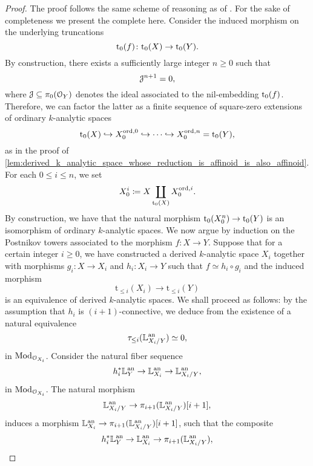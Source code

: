 \documentclass[10pt,a4paper,reqno]{amsart} %
\theoremstyle{plain}
\theoremstyle{definition}
\theoremstyle{remark}
\numberwithin{equation}{section}
\begin{document}
\begin{proof}
    The proof follows the same scheme of reasoning as of \cite[Proposition 5.5.3]{Gaitsgory_Study_II}. For the sake of completeness we present the complete here.
    Consider the induced morphism on the underlying truncations
        \[
            \mathrm{t}_0(f) \colon \mathrm{t}_0(X) \to \mathrm{t}_0(Y).   
        \]
    By construction, there exists a sufficiently large integer $n \ge 0$ such that
        \[
            \mathcal J^{n+1} = 0,  
        \]
    where $\mathcal J \subseteq \pi_0(\mathcal O_Y)$ denotes the ideal associated to the nil-embedding $\mathrm{t}_0(f)$.
    Therefore, we can factor the latter as a finite sequence of square-zero extensions of ordinary $k$-analytic spaces
        \[
            \mathrm{t}_0(X) \hookrightarrow X_0^{\mathrm{ord}, 0} \hookrightarrow \dots \hookrightarrow X^{\mathrm{ord}, n}_0 = \mathrm{t}_0(Y),
        \]
    as in the proof of \cref{lem:derived_k_analytic_space_whose_reduction_is_affinoid_is_also_affinoid}. For each $0 \le i \le n$, we set
        \[
            X_0^i \coloneqq X \coprod_{\mathrm{t}_0(X)} X_0^{\mathrm{ord}, i}.
        \]
    By construction, we have that the natural morphism $\mathrm{t}_0(X_0^n) \to \mathrm{t}_0(Y)$ is an isomorphism of ordinary $k$-analytic spaces.
    We now argue by induction on the Postnikov towers associated to the morphism $f \colon X \to Y$.
    Suppose that for a certain integer $i \ge 0$, we have constructed a derived $k$-analytic space $X_i$ together with morphisms $g_i \colon
    X \to X_i$ and $h_i \colon X_i \to Y$ such that $f \simeq h_i \circ g_i$
    and the induced morphism
        \[
            \mathrm{t}_{\le i}(X_i) \to \mathrm{t}_{\le i}(Y)
        \]
    is an equivalence of derived $k$-analytic spaces. We shall proceed as follows: by the assumption that $h_i$ is $(i+1)$-connective, we deduce from
    \cite[Proposition 5.34]{Porta_Yu_Representability} the existence of a natural equivalence
        \[
            \tau_{\le i}(\mathbb L_{X_i/Y}^\mathrm{an}) \simeq 0,
        \]
    in $\mathrm{Mod}_{\mathcal O_{X_i}}$. Consider the natural fiber sequence
        \[
            h_i^* \mathbb L^\mathrm{an}_{Y} \to \mathbb L^\mathrm{an}_{X_i} \to \mathbb L^\mathrm{an}_{X_i/Y},
        \]
    in $\mathrm{Mod}_{\mathcal O_{X_i}}$. The natural morphism
        \[
            \mathbb L^\mathrm{an}_{X_i/ Y} \to \pi_{i+1}(\mathbb L^\mathrm{an}_{X_i/Y})[i+1],  
        \]
    induces a morphism $\mathbb L^\mathrm{an}_{X_i} \to \pi_{i+1}(\mathbb L^\mathrm{an}_{X_i/Y})[i+1]$, such that the composite
        \begin{equation} \label{eq:fiber_sequence_of_cotangent_complexes_to_produce_the_existence_of_the_desired_square_zero_extension_approximating_Y_in_degree_i+1}
            h_i^* \bbL\an_{Y} \to \bbL\an_{X_i} \to \pi_{i+1}(\bbL\an_{X_i/Y}),  

\end{equation}
\end{proof}
\end{document}
